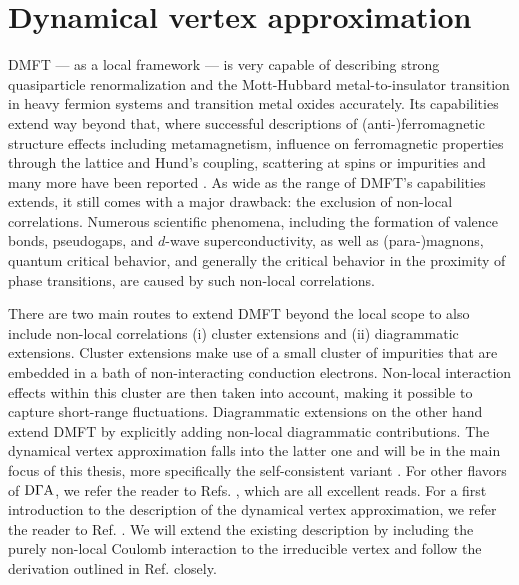 \documentclass[../../main.tex]{subfiles}
\begin{document}
\section{Dynamical vertex approximation}

DMFT --- as a local framework --- is very capable of describing strong quasiparticle renormalization and the Mott-Hubbard metal-to-insulator transition in heavy fermion systems and transition metal oxides accurately. Its capabilities extend way beyond that, where successful descriptions of (anti-)ferromagnetic structure effects including metamagnetism, influence on ferromagnetic properties through the lattice and Hund's coupling, scattering at spins or impurities and many more have been reported \cite{held dmft}. As wide as the range of DMFT's capabilities extends, it still comes with a major drawback: the exclusion of non-local correlations. Numerous scientific phenomena, including the formation of valence bonds, pseudogaps, and $d$-wave superconductivity, as well as (para-)magnons, quantum critical behavior, and generally the critical behavior in the proximity of phase transitions, are caused by such non-local correlations.

There are two main routes to extend DMFT beyond the local scope to also include non-local correlations \cite{rohringer two particle} (i) cluster extensions and (ii) diagrammatic extensions. Cluster extensions make use of a small cluster of impurities that are embedded in a bath of non-interacting conduction electrons. Non-local interaction effects within this cluster are then taken into account, making it possible to capture short-range fluctuations. Diagrammatic extensions on the other hand extend DMFT by explicitly adding non-local diagrammatic contributions. The dynamical vertex approximation falls into the latter one and will be in the main focus of this thesis, more specifically the self-consistent  variant \cite{josef sc dga}. For other flavors of $\text{D}\Gamma\text{A}$, we refer the reader to Refs. \cite{del re, valli nanorings, schäfer multimethod, kat.tos.held 2009}, which are all excellent reads. For a first introduction to the  description of the dynamical vertex approximation, we refer the reader to Ref. \cite{kat.tos.held 2007}. We will extend the existing description by including the purely non-local Coulomb interaction to the irreducible vertex and follow the derivation outlined in Ref. \cite{ab initio dga} closely. 
\end{document}
